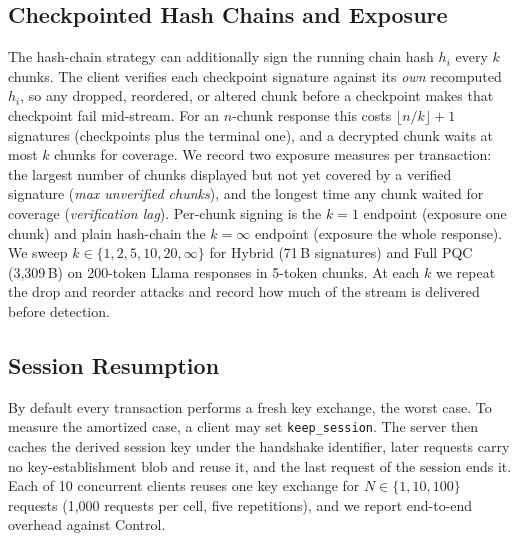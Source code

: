 \subsection{Checkpointed Hash Chains and Exposure}\label{sec:checkpoint}
The hash-chain strategy can additionally sign the running chain hash $h_i$ every $k$ chunks.
The client verifies each checkpoint signature against its \emph{own} recomputed $h_i$, so any
dropped, reordered, or altered chunk before a checkpoint makes that checkpoint fail mid-stream.
For an $n$-chunk response this costs $\lfloor n/k\rfloor + 1$ signatures (checkpoints plus the
terminal one), and a decrypted chunk waits at most $k$ chunks for coverage. We record two exposure
measures per transaction: the largest number of chunks displayed but not yet covered by a verified
signature (\emph{max unverified chunks}), and the longest time any chunk waited for coverage
(\emph{verification lag}). Per-chunk signing is the $k=1$ endpoint (exposure one chunk) and plain
hash-chain the $k=\infty$ endpoint (exposure the whole response). We sweep
$k\in\{1,2,5,10,20,\infty\}$ for Hybrid (71\,B signatures) and Full PQC (3,309\,B) on 200-token
Llama responses in 5-token chunks. At each $k$ we repeat the drop and reorder attacks and record
how much of the stream is delivered before detection.

\subsection{Session Resumption}\label{sec:sessions}
By default every transaction performs a fresh key exchange, the worst case. To measure the
amortized case, a client may set \texttt{keep\_session}. The server then caches the derived session
key under the handshake identifier, later requests carry no key-establishment blob and reuse it,
and the last request of the session ends it. Each of 10 concurrent clients reuses one key exchange
for $N\in\{1,10,100\}$ requests (1,000 requests per cell, five repetitions), and we report
end-to-end overhead against Control.

